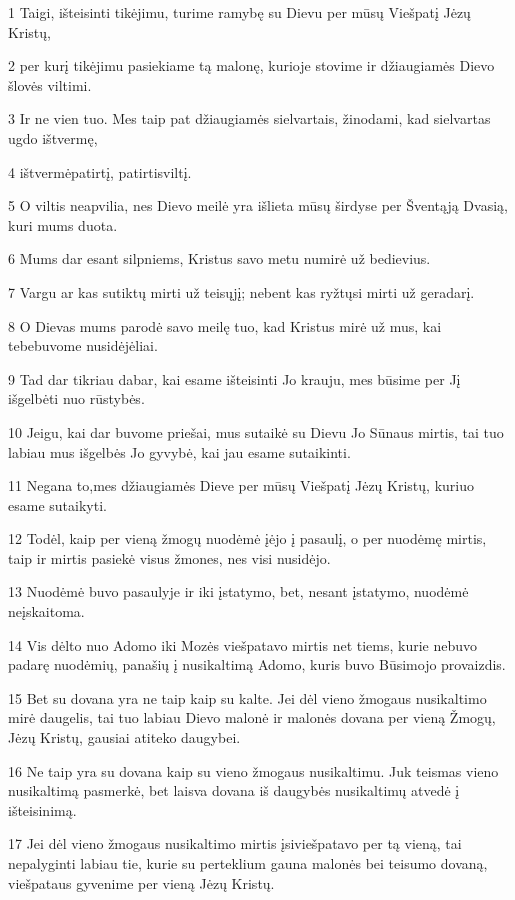 \par 1 Taigi, išteisinti tikėjimu, turime ramybę su Dievu per mūsų Viešpatį Jėzų Kristų, 
\par 2 per kurį tikėjimu pasiekiame tą malonę, kurioje stovime ir džiaugiamės Dievo šlovės viltimi. 
\par 3 Ir ne vien tuo. Mes taip pat džiaugiamės sielvartais, žinodami, kad sielvartas ugdo ištvermę, 
\par 4 ištvermė­patirtį, patirtis­viltį. 
\par 5 O viltis neapvilia, nes Dievo meilė yra išlieta mūsų širdyse per Šventąją Dvasią, kuri mums duota. 
\par 6 Mums dar esant silpniems, Kristus savo metu numirė už bedievius. 
\par 7 Vargu ar kas sutiktų mirti už teisųjį; nebent kas ryžtųsi mirti už geradarį. 
\par 8 O Dievas mums parodė savo meilę tuo, kad Kristus mirė už mus, kai tebebuvome nusidėjėliai. 
\par 9 Tad dar tikriau dabar, kai esame išteisinti Jo krauju, mes būsime per Jį išgelbėti nuo rūstybės. 
\par 10 Jeigu, kai dar buvome priešai, mus sutaikė su Dievu Jo Sūnaus mirtis, tai tuo labiau mus išgelbės Jo gyvybė, kai jau esame sutaikinti. 
\par 11 Negana to,­mes džiaugiamės Dieve per mūsų Viešpatį Jėzų Kristų, kuriuo esame sutaikyti. 
\par 12 Todėl, kaip per vieną žmogų nuodėmė įėjo į pasaulį, o per nuodėmę mirtis, taip ir mirtis pasiekė visus žmones, nes visi nusidėjo. 
\par 13 Nuodėmė buvo pasaulyje ir iki įstatymo, bet, nesant įstatymo, nuodėmė neįskaitoma. 
\par 14 Vis dėlto nuo Adomo iki Mozės viešpatavo mirtis net tiems, kurie nebuvo padarę nuodėmių, panašių į nusikaltimą Adomo, kuris buvo Būsimojo provaizdis. 
\par 15 Bet su dovana yra ne taip kaip su kalte. Jei dėl vieno žmogaus nusikaltimo mirė daugelis, tai tuo labiau Dievo malonė ir malonės dovana per vieną Žmogų, Jėzų Kristų, gausiai atiteko daugybei. 
\par 16 Ne taip yra su dovana kaip su vieno žmogaus nusikaltimu. Juk teismas vieno nusikaltimą pasmerkė, bet laisva dovana iš daugybės nusikaltimų atvedė į išteisinimą. 
\par 17 Jei dėl vieno žmogaus nusikaltimo mirtis įsiviešpatavo per tą vieną, tai nepalyginti labiau tie, kurie su perteklium gauna malonės bei teisumo dovaną, viešpataus gyvenime per vieną Jėzų Kristų. 
